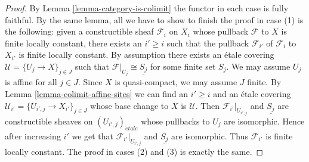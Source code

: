 \documentclass[10pt,a4paper]{amsart}
\theoremstyle{plain}
\theoremstyle{definition}
\theoremstyle{remark}
\numberwithin{equation}{subsection}
\def\etale{{\acute{e}tale}}
\begin{document}
\begin{proof}
By Lemma \ref{lemma-category-is-colimit} the functor in each case
is fully faithful. By the same lemma, all we have to show to finish
the proof in case (1) is the following: given a constructible sheaf
$\mathcal{F}_i$ on $X_i$ whose pullback $\mathcal{F}$ to $X$ is
finite locally constant, there exists an $i' \geq i$ such that the
pullback $\mathcal{F}_{i'}$ of $\mathcal{F}_i$ to $X_{i'}$
is finite locally constant. By assumption there exists an \'etale covering
$\mathcal{U} = \{U_j \to X\}_{j \in J}$
such that $\mathcal{F}|_{U_j} \cong \underline{S_j}$ for some finite set $S_j$.
We may assume $U_j$ is affine for all $j \in J$.
Since $X$ is quasi-compact, we may assume $J$ finite.
By Lemma \ref{lemma-colimit-affine-sites} we can find an $i' \geq i$
and an \'etale covering $\mathcal{U}_{i'} = \{U_{i', j} \to X_{i'}\}_{j \in J}$
whose base change to $X$ is $\mathcal{U}$. Then
$\mathcal{F}_{i'}|_{U_{i', j}}$ and $\underline{S_j}$ are
constructible sheaves on $(U_{i', j})_\etale$ whose pullbacks to
$U_j$ are isomorphic. Hence after increasing $i'$ we get
that $\mathcal{F}_{i'}|_{U_{i', j}}$ and $\underline{S_j}$
are isomorphic. Thus $\mathcal{F}_{i'}$ is finite locally constant.
The proof in cases (2) and (3) is exactly the same.
\end{proof}
\end{document}
